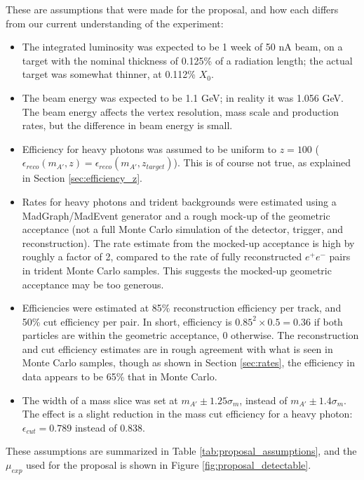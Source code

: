 These are assumptions that were made for the proposal, and how each differs from our current understanding of the experiment:
\begin{itemize}
\item The integrated luminosity was expected to be 1 week of 50 nA beam, on a target with the nominal thickness of 0.125\% of a radiation length; the actual target was somewhat thinner, at 0.112\% $X_0$.
\item The beam energy was expected to be 1.1 GeV; in reality it was 1.056 GeV. The beam energy affects the vertex resolution, mass scale and production rates, but the difference in beam energy is small.
\item Efficiency for heavy photons was assumed to be uniform to $z=100$ ($\epsilon_{reco}(m_{A'},z) = \epsilon_{reco}(m_{A'},z_{target})$).
This is of course not true, as explained in Section \ref{sec:efficiency_z}.
\item Rates for heavy photons and trident backgrounds were estimated using a MadGraph/MadEvent generator and a rough mock-up of the geometric acceptance (not a full Monte Carlo simulation of the detector, trigger, and reconstruction).
The rate estimate from the mocked-up acceptance is high by roughly a factor of 2, compared to the rate of fully reconstructed $e^+e^-$ pairs in trident Monte Carlo samples.
This suggests the mocked-up geometric acceptance may be too generous.
\item Efficiencies were estimated at 85\% reconstruction efficiency per track, and 50\% cut efficiency per pair.
In short, efficiency is $0.85^2\times 0.5=0.36$ if both particles are within the geometric acceptance, 0 otherwise.
The reconstruction and cut efficiency estimates are in rough agreement with what is seen in Monte Carlo samples, though as shown in Section \ref{sec:rates}, the efficiency in data appears to be 65\% that in Monte Carlo.
\item The width of a mass slice was set at $m_{A'}\pm 1.25\sigma_m$, instead of $m_{A'}\pm 1.4\sigma_m$. The effect is a slight reduction in the mass cut efficiency for a heavy photon: $\epsilon_{cut}=0.789$ instead of 0.838.
\end{itemize}

These assumptions are summarized in Table \ref{tab:proposal_assumptions}, and the $\mu_{exp}$ used for the proposal is shown in Figure \ref{fig:proposal_detectable}.

